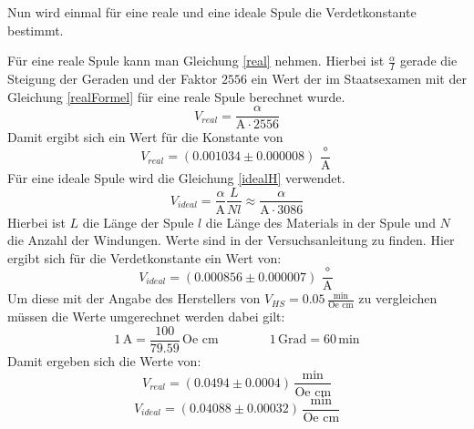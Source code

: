 Nun wird einmal für eine reale und eine ideale Spule die Verdetkonstante bestimmt.\par
Für eine reale Spule kann man Gleichung \ref{real} nehmen. Hierbei ist $\frac{\alpha}{I}$ gerade die Steigung der Geraden und der Faktor $2556$ ein Wert der im Staatsexamen\cite{staatsexamen} mit der Gleichung \ref{realFormel} für eine reale Spule berechnet wurde.
\begin{equation}
	V_{real}=\frac{\alpha}{\text{A}\cdot 2556}
	\label{real}
\end{equation}
Damit ergibt sich ein Wert für die Konstante von $$V_{real}=(0.001034 \pm 0.000008)\,\frac{\circ}{\text{A}}$$
Für eine ideale Spule wird die Gleichung \ref{idealH} verwendet.
\begin{equation}
	V_{ideal}=\frac{\alpha}{\text{A}}\frac{L}{Nl}\approx \frac{\alpha}{\text{A}\cdot 3086}
	\label{idealH}
\end{equation}
Hierbei ist $L$ die Länge der Spule $l$ die Länge des Materials in der Spule und $N$ die Anzahl der Windungen. Werte sind in der Versuchsanleitung zu finden\cite{anleitung}. Hier ergibt sich für die Verdetkonstante ein Wert von:
$$V_{ideal}=(0.000856 \pm 0.000007)\,\frac{\circ}{\text{A}}$$
Um diese mit der Angabe des Herstellers von $V_{HS}=0.05\,\frac{\text{min}}{\text{Oe cm}}$ zu vergleichen müssen die Werte umgerechnet werden dabei gilt:
$$1\,\text{A}=\frac{100}{79.59}\,\text{Oe cm}  \qquad \qquad 1\,\text{Grad}=60\,\text{min}$$
Damit ergeben sich die Werte von:
$$V_{real}=(0.0494 \pm 0.0004)\,\frac{\text{min}}{\text{Oe cm}}$$
$$V_{ideal}=(0.04088 \pm 0.00032)\,\frac{\text{min}}{\text{Oe cm}}$$